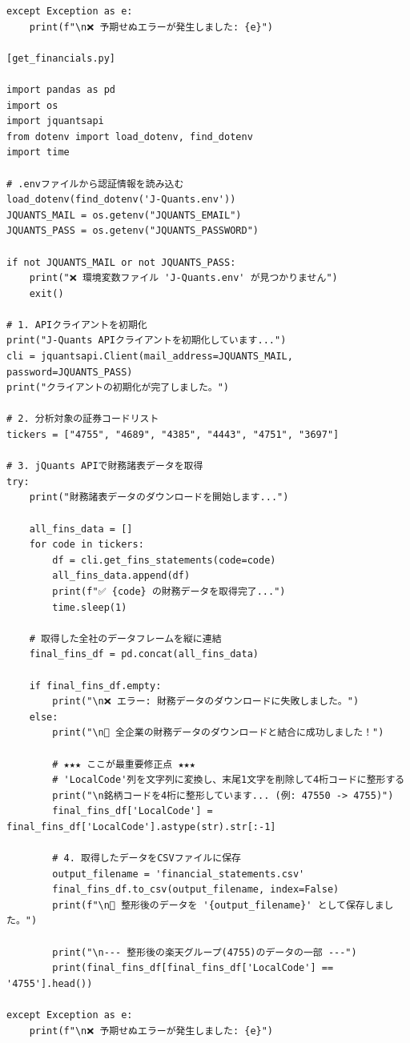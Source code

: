 \documentclass[a4paper, 11pt]{ltjsarticle}
\begin{document}
\begin{verbatim}
except Exception as e:
    print(f"\n❌ 予期せぬエラーが発生しました: {e}")

[get_financials.py]

import pandas as pd
import os
import jquantsapi
from dotenv import load_dotenv, find_dotenv
import time

# .envファイルから認証情報を読み込む
load_dotenv(find_dotenv('J-Quants.env'))
JQUANTS_MAIL = os.getenv("JQUANTS_EMAIL")
JQUANTS_PASS = os.getenv("JQUANTS_PASSWORD")

if not JQUANTS_MAIL or not JQUANTS_PASS:
    print("❌ 環境変数ファイル 'J-Quants.env' が見つかりません")
    exit()

# 1. APIクライアントを初期化
print("J-Quants APIクライアントを初期化しています...")
cli = jquantsapi.Client(mail_address=JQUANTS_MAIL, password=JQUANTS_PASS)
print("クライアントの初期化が完了しました。")

# 2. 分析対象の証券コードリスト
tickers = ["4755", "4689", "4385", "4443", "4751", "3697"]

# 3. jQuants APIで財務諸表データを取得
try:
    print("財務諸表データのダウンロードを開始します...")
    
    all_fins_data = []
    for code in tickers:
        df = cli.get_fins_statements(code=code)
        all_fins_data.append(df)
        print(f"✅ {code} の財務データを取得完了...")
        time.sleep(1)

    # 取得した全社のデータフレームを縦に連結
    final_fins_df = pd.concat(all_fins_data)
    
    if final_fins_df.empty:
        print("\n❌ エラー: 財務データのダウンロードに失敗しました。")
    else:
        print("\n🎉 全企業の財務データのダウンロードと結合に成功しました！")
        
        # ★★★ ここが最重要修正点 ★★★
        # 'LocalCode'列を文字列に変換し、末尾1文字を削除して4桁コードに整形する
        print("\n銘柄コードを4桁に整形しています... (例: 47550 -> 4755)")
        final_fins_df['LocalCode'] = final_fins_df['LocalCode'].astype(str).str[:-1]
        
        # 4. 取得したデータをCSVファイルに保存
        output_filename = 'financial_statements.csv'
        final_fins_df.to_csv(output_filename, index=False)
        print(f"\n📄 整形後のデータを '{output_filename}' として保存しました。")
        
        print("\n--- 整形後の楽天グループ(4755)のデータの一部 ---")
        print(final_fins_df[final_fins_df['LocalCode'] == '4755'].head())

except Exception as e:
    print(f"\n❌ 予期せぬエラーが発生しました: {e}")



\end{verbatim}
\end{document}

